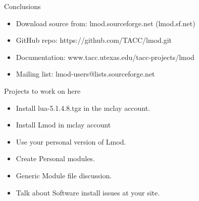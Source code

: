 \documentclass{beamer}
\begin{document}
\begin{frame}{Conclusions}
  \begin{itemize}
    \item Download source from: lmod.sourceforge.net (lmod.sf.net)
    \item GitHub repo: https://github.com/TACC/lmod.git
    \item Documentation: www.tacc.utexas.edu/tacc-projects/lmod
    \item Mailing list: lmod-users@lists.sourceforge.net
  \end{itemize}
\end{frame}


\begin{frame}{Projects to work on here}
  \begin{itemize}
    \item Install lua-5.1.4.8.tgz in the mclay account.
    \item Install Lmod in mclay account
    \item Use your personal version of Lmod.
    \item Create Personal modules.
    \item Generic Module file discussion.
    \item Talk about Software install issues at your site.
  \end{itemize}
\end{frame}
\end{document}

